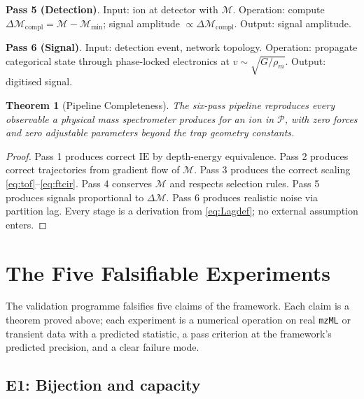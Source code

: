 \documentclass[twocolumn,10pt,a4paper]{article}
\theoremstyle{thmstyle}
\newtheorem{theorem}{Theorem}[section]
\theoremstyle{definition}
\theoremstyle{remark}
\newcommand{\Parts}{\mathcal{P}}
\newcommand{\Depth}{\mathcal{M}}
\begin{document}
\textbf{Pass 5 (Detection)}. Input: ion at detector with $\Depth$.
Operation: compute $\Delta\Depth_{\mathrm{compl}}=\Depth-\Depth_{\min}$;
signal amplitude $\propto\Delta\Depth_{\mathrm{compl}}$. Output: signal
amplitude.

\textbf{Pass 6 (Signal)}. Input: detection event, network topology.
Operation: propagate categorical state through phase-locked
electronics at $v\sim\sqrt{G/\rho_{m}}$. Output: digitised signal.

\begin{theorem}[Pipeline Completeness]
\label{thm:complete}
The six-pass pipeline reproduces every observable a physical
mass spectrometer produces for an ion in $\Parts$, with zero forces
and zero adjustable parameters beyond the trap geometry constants.
\end{theorem}

\begin{proof}
Pass 1 produces correct $\mathrm{IE}$ by depth-energy equivalence.
Pass 2 produces correct trajectories from gradient flow of $\Depth$.
Pass 3 produces the correct scaling \eqref{eq:tof}--\eqref{eq:ftcir}.
Pass 4 conserves $\Depth$ and respects selection rules. Pass 5
produces signals proportional to $\Delta\Depth$. Pass 6 produces
realistic noise via partition lag. Every stage is a derivation from
\eqref{eq:Lagdef}; no external assumption enters.
\end{proof}

\section{The Five Falsifiable Experiments}
\label{sec:experiments}

The validation programme falsifies five claims of the framework.
Each claim is a theorem proved above; each experiment is a numerical
operation on real \texttt{mzML} or transient data with a predicted
statistic, a pass criterion at the framework's predicted precision,
and a clear failure mode.

\subsection{E1: Bijection and capacity}
\end{document}
